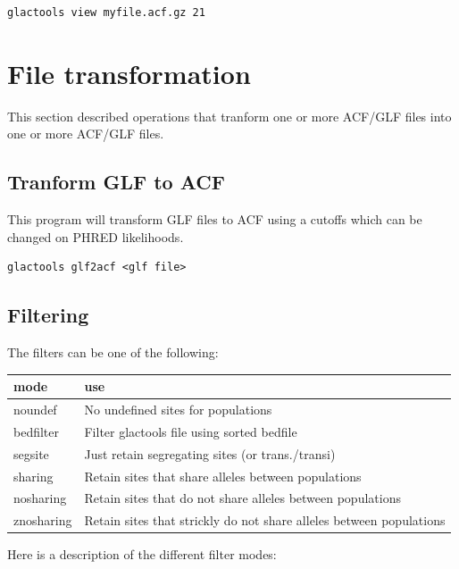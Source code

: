 \documentclass[a4paper]{article}
\begin{document}
\begin{lstlisting}
glactools view myfile.acf.gz 21
\end{lstlisting}

\newpage

\section{File transformation}

This section described operations that tranform one or more ACF/GLF files into one or more ACF/GLF files.

\subsection{Tranform GLF to ACF}

This program will transform GLF files to ACF using a cutoffs which can be changed on PHRED likelihoods.
\begin{lstlisting}
glactools glf2acf <glf file>
\end{lstlisting}



\subsection{Filtering}
The filters can be one of the following:

\begin{tabular}{ll}
\hline
mode & use \\
\hline
noundef      &   No undefined sites for populations \\
bedfilter    &   Filter glactools file using sorted bedfile \\
segsite      &   Just retain segregating sites (or trans./transi) \\
sharing      &   Retain sites that share alleles between populations \\
nosharing    &   Retain sites that do not share alleles between populations \\
znosharing   &   Retain sites that strickly do not share alleles between populations \\
\end{tabular}

Here is a description of the different filter modes:
\end{document}
